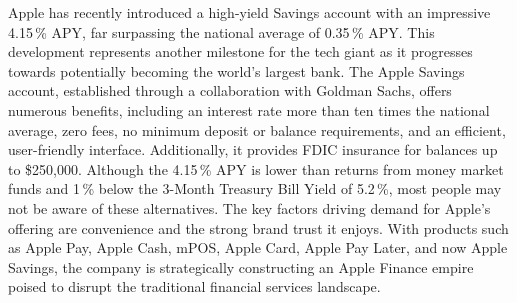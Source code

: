 Apple has recently introduced a high-yield Savings account with an impressive 4.15\,\% APY, far surpassing the national average of 0.35\,\% APY. This development represents another milestone for the tech giant as it progresses towards potentially becoming the world's largest bank. The Apple Savings account, established through a collaboration with Goldman Sachs, offers numerous benefits, including an interest rate more than ten times the national average, zero fees, no minimum deposit or balance requirements, and an efficient, user-friendly interface. Additionally, it provides FDIC insurance for balances up to \$250,000. Although the 4.15\,\% APY is lower than returns from money market funds and 1\,\% below the 3-Month Treasury Bill Yield of 5.2\,\%, most people may not be aware of these alternatives. The key factors driving demand for Apple's offering are convenience and the strong brand trust it enjoys.
With products such as Apple Pay, Apple Cash, mPOS, Apple Card, Apple Pay Later, and now Apple Savings, the company is strategically constructing an Apple Finance empire poised to disrupt the traditional financial services landscape.

